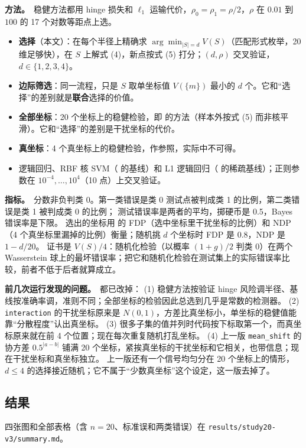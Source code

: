 \documentclass[11pt,a4paper,fontset=none]{ctexart}
\theoremstyle{definition}
\newcommand{\para}[1]{\par\smallskip\noindent\textbf{#1}\ }
\begin{document}
\para{方法。}稳健方法都用 hinge 损失和 $\ell_1$ 运输代价，$\rho_0=\rho_1=\rho/2$，$\rho$ 在 $0.01$ 到 $100$ 的 17 个对数等距点上选。
\begin{itemize}
\item \textbf{选择}（本文）：在每个半径上精确求 $\arg\min_{|S|=d}V(S)$（匹配形式枚举，20 维足够快），在 $S$ 上解式 (4)，新点按式 (5) 打分；$(d,\rho)$ 交叉验证，$d\in\{1,2,3,4\}$。
\item \textbf{边际筛选}：同一流程，只是 $S$ 取单坐标值 $V(\{m\})$ 最小的 $d$ 个。它和“选择”的差别就是\textbf{联合}选择的价值。
\item \textbf{全部坐标}：20 个坐标上的稳健检验，即 \cite{xie2021robust} 的方法（样本外按式 (5) 而非核平滑）。它和“选择”的差别是干扰坐标的代价。
\item \textbf{真坐标}：4 个真坐标上的稳健检验，作参照，实际中不可得。
\item 逻辑回归、RBF 核 SVM（\cite{xie2021robust} 的基线）和 L1 逻辑回归（\cite{wang2023variable} 的稀疏基线）；正则参数在 $10^{-4},\dots,10^{4}$（10 点）上交叉验证。
\end{itemize}

\para{指标。}分数非负判类 0。第一类错误是类 0 测试点被判成类 1 的比例，第二类错误是类 1 被判成类 0 的比例；
测试错误率是两者的平均，掷硬币是 0.5，Bayes 错误率是下限。
选出的坐标用 \cite{wang2023variable} 的 FDP（选中坐标里干扰坐标的比例）和 NDP（4 个真坐标里漏掉的比例）衡量；随机挑 $d$ 个坐标时 FDP 是 0.8，NDP 是 $1-d/20$。
证书是 $V(S)/4$：随机化检验（以概率 $(1+g)/2$ 判类 0）在两个 Wasserstein 球上的最坏错误率；把它和随机化检验在测试集上的实际错误率比较，前者不低于后者就算成立。

\para{前几次运行发现的问题。}都已改掉：
(1) 稳健方法按验证 hinge 风险调半径、基线按准确率调，准则不同；全部坐标的检验因此总选到几乎是常数的检测器。
(2) \texttt{interaction} 的干扰坐标原来是 $N(0,1)$，方差比真坐标小，单坐标的稳健值能靠“分散程度”认出真坐标。
(3) 很多子集的值并列时代码按下标取第一个，而真坐标原来就在前 4 个位置；现在每次重复随机打乱坐标。
(4) 上一版 \texttt{mean\_shift} 的协方差 $0.5^{|a-b|}$ 铺满 20 个坐标，紧挨真坐标的干扰坐标和它相关，也带信息；现在干扰坐标和真坐标独立。
上一版还有一个信号均匀分在 20 个坐标上的情形，$d\le4$ 的选择接近随机；它不属于“少数真坐标”这个设定，这一版去掉了。

\subsection{结果}
四张图和全部表格（含 $n=20$、标准误和两类错误）在 \texttt{results/study20-v3/summary.md}。
\end{document}
